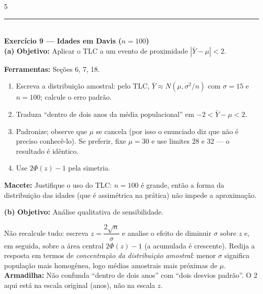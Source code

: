 \documentclass[a4paper,8pt]{extarticle}
\newcommand{\tit}[1]{\vspace{2pt}\textcolor{azul}{\rule{\linewidth}{0.6pt}}\\[1pt]\textbf{\textcolor{azul}{#1}}\\[1pt]}
\newcommand{\mac}[1]{\textcolor{verde}{\textbf{Macete:}} #1\par}
\newcommand{\arm}[1]{\textcolor{vinho}{\textbf{Armadilha:}} #1\par}
\newcommand{\ferr}[1]{\textbf{Ferramentas:} #1\par}
\newcommand{\obj}[1]{\textbf{Objetivo:} #1\par}
\begin{document}
\begin{multicols*}{5}
\tit{Exercício 9 — Idades em Davis ($n=100$)}
\textbf{(a)} \obj{Aplicar o TLC a um evento de proximidade $|\bar Y-\mu|<2$.}
\ferr{Seções 6, 7, 18.}
\begin{enumerate}
\item Escreva a distribuição amostral: pelo TLC, $\bar Y\approx N(\mu,\sigma^2/n)$ com $\sigma=15$ e $n=100$; calcule o erro padrão.
\item Traduza “dentro de dois anos da média populacional” em $-2<\bar Y-\mu<2$.
\item Padronize; observe que $\mu$ se cancela (por isso o enunciado diz que não é preciso conhecê-lo). Se preferir, fixe $\mu=30$ e use limites $28$ e $32$ — o resultado é idêntico.
\item Use $2\Phi(z)-1$ pela simetria.
\end{enumerate}
\mac{Justifique o uso do TLC: $n=100$ é grande, então a forma da distribuição das idades (que é assimétrica na prática) não impede a aproximação.}
\textbf{(b)} \obj{Análise qualitativa de sensibilidade.}
Não recalcule tudo: escreva $z=\dfrac{2\sqrt n}{\sigma}$ e analise o efeito de diminuir $\sigma$ sobre $z$ e, em seguida, sobre a área central $2\Phi(z)-1$ (a acumulada é crescente). Redija a resposta em termos de \emph{concentração da distribuição amostral}: menor $\sigma$ significa população mais homogênea, logo médias amostrais mais próximas de $\mu$.
\arm{Não confunda “dentro de dois anos” com “dois desvios padrão”. O 2 aqui está na escala original (anos), não na escala $z$.}


\end{multicols*}
\end{document}
